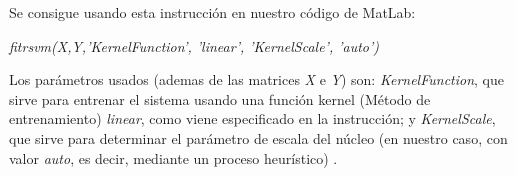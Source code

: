 Se consigue usando esta instrucción en nuestro código de MatLab:

\begin{center}
\textit{fitrsvm(X,Y,'KernelFunction', 'linear', 'KernelScale', 'auto')}
\end{center}

Los parámetros usados (ademas de las matrices \textit{X} e \textit{Y}) son: \textit{KernelFunction}, que sirve para entrenar el sistema usando una función kernel (Método de entrenamiento) \textit{linear}, como viene especificado en la instrucción; y \textit{KernelScale}, que sirve para determinar el parámetro de escala del núcleo (en nuestro caso, con valor \textit{auto}, es decir, mediante un proceso heurístico) \cite{fitrsvm}.



